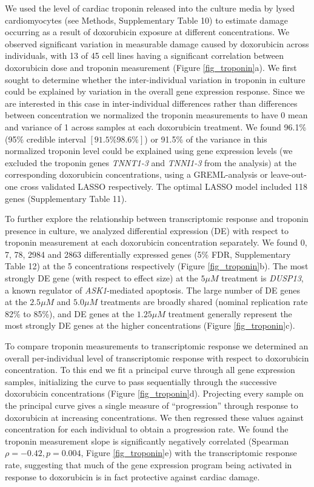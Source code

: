 \documentclass{article}
\begin{document}
We used the level of cardiac troponin released into the culture media by lysed cardiomyocytes (see Methods, Supplementary Table 10) to estimate damage occurring as a result of doxorubicin exposure at different concentrations. We observed significant variation in measurable damage caused by doxorubicin across individuals, with 13 of 45 cell lines having a significant correlation between doxorubicin dose and troponin measurement (Figure \ref{fig_troponin}a). We first sought to determine whether the inter-individual variation in troponin in culture could be explained by variation in the overall gene expression response. Since we are interested in this case in inter-individual differences rather than differences between concentration we normalized the troponin measurements to have 0 mean and variance of 1 across samples at each doxorubicin treatment. We found 96.1\% (95\% credible interval $[91.5\% 98.6\%]$) or 91.5\% of the variance in this normalized troponin level could be explained using gene expression levels (we excluded the troponin genes \emph{TNNT1-3} and \emph{TNNI1-3} from the analysis) at the corresponding doxorubicin concentrations, using a GREML-analysis\cite{Yang2010-cx} or leave-out-one cross validated LASSO\cite{tibshirani1996regression} respectively. The optimal LASSO model included 118 genes (Supplementary Table 11). 

To further explore the relationship between transcriptomic response and troponin presence in culture, we analyzed differential expression (DE) with respect to troponin measurement at each doxorubicin concentration separately. We found 0, 7, 78, 2984 and 2863 differentially expressed genes (5\% FDR, Supplementary Table 12) at the 5 concentrations respectively (Figure \ref{fig_troponin}b). The most strongly DE gene (with respect to effect size) at the $5 \mu M$ treatment is \emph{DUSP13}, a known regulator of \emph{ASK1}-mediated apoptosis\cite{park2010positive}. The large number of DE genes at the $2.5 \mu M$ and $5.0 \mu M$ treatments are broadly shared (nominal replication rate 82\% to 85\%), and DE genes at the $1.25 \mu M$ treatment generally represent the most strongly DE genes at the higher concentrations (Figure \ref{fig_troponin}c). 

To compare troponin measurements to transcriptomic response we determined an overall per-individual level of transcriptomic response with respect to doxorubicin concentration. To this end we fit a principal curve\citep{hastie1989principal} through all gene expression samples, initializing the curve to pass sequentially through the successive doxorubicin concentrations (Figure \ref{fig_troponin}d). Projecting every sample on the principal curve gives a single measure of ``progression'' through response to doxorubicin at increasing concentrations. We then regressed these values against concentration for each individual to obtain a progression rate. We found the troponin measurement slope is significantly negatively correlated (Spearman $\rho=-0.42, p=0.004$, Figure \ref{fig_troponin}e) with the transcriptomic response rate, suggesting that much of the gene expression program being activated in response to doxorubicin is in fact protective against cardiac damage. 
\end{document}
